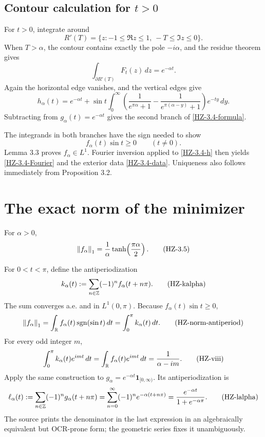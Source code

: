 \subsection{Contour calculation for \texorpdfstring{$t>0$}{t greater than 0}}

For $t>0$, integrate around
\[
  R'(T)=\{z:-1\le\Re z\le1,\ -T\le\Im z\le0\}.
\]
When $T>\alpha$, the contour contains exactly the pole $-i\alpha$, and the residue theorem gives
\[
  \int_{\partial R'(T)}F_t(z)\,dz=e^{-\alpha t}.
  \tag{HZ-contour-down}\label{HZ-contour-down}
\]
Again the horizontal edge vanishes, and the vertical edges give
\[
  h_\alpha(t)
  =e^{-\alpha t}
   +\sin t\int_0^\infty
    \left(\frac1{e^{\pi\alpha}+1}
          -\frac1{e^{\pi(\alpha-y)}+1}
    \right)e^{-ty}\,dy.
  \tag{HZ-vii-h}\label{HZ-vii-h}
\]
Subtracting from $g_\alpha(t)=e^{-\alpha t}$ gives the second branch of \eqref{HZ-3.4-formula}.

The integrands in both branches have the sign needed to show
\[
  f_\alpha(t)\sin t\ge0\qquad(t\ne0).
  \tag{HZ-3.4-sign-pointwise}\label{HZ-3.4-sign-pointwise}
\]
Lemma 3.3 proves $f_\alpha\in L^1$. Fourier inversion applied to \eqref{HZ-3.4-h} then yields \eqref{HZ-3.4-Fourier} and the exterior data \eqref{HZ-3.4-data}. Uniqueness also follows immediately from Proposition 3.2.

\section{The exact norm of the minimizer}


\begin{lemma}
For $\alpha>0$,
\[
  \left\lVert f_\alpha\right\rVert_1
  =\frac1\alpha\tanh\!\left(\frac{\pi\alpha}{2}\right).
  \tag{HZ-3.5}\label{HZ-3.5}
\]
\end{lemma}

For $0<t<\pi$, define the antiperiodization
\[
  k_\alpha(t):=\sum_{n\in\mathbb{Z}}(-1)^n f_\alpha(t+n\pi).
  \tag{HZ-kalpha}\label{HZ-kalpha}
\]
The sum converges a.e. and in $L^1(0,\pi)$. Because $f_\alpha(t)\sin t\ge0$,
\[
  \left\lVert f_\alpha\right\rVert_1
  =\int_{\mathbb{R}}f_\alpha(t)\operatorname{sgn}(\sin t)\,dt
  =\int_0^\pi k_\alpha(t)\,dt.
  \tag{HZ-norm-antiperiod}\label{HZ-norm-antiperiod}
\]
For every odd integer $m$,
\[
  \int_0^\pi k_\alpha(t)e^{imt}\,dt
  =\int_{\mathbb{R}}f_\alpha(t)e^{imt}\,dt
  =\frac1{\alpha-im}.
  \tag{HZ-viii}\label{HZ-viii}
\]
Apply the same construction to $g_\alpha=e^{-\alpha t}\mathbf1_{[0,\infty)}$. Its antiperiodization is
\[
  \ell_\alpha(t)
  :=\sum_{n\in\mathbb{Z}}(-1)^n g_\alpha(t+n\pi)
  =\sum_{n=0}^\infty(-1)^n e^{-\alpha(t+n\pi)}
  =\frac{e^{-\alpha t}}{1+e^{-\alpha\pi}}.
  \tag{HZ-lalpha}\label{HZ-lalpha}
\]
The source prints the denominator in the last expression in an algebraically equivalent but OCR-prone form; the geometric series fixes it unambiguously.

